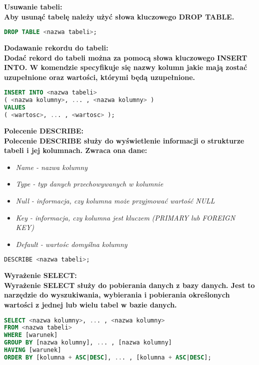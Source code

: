 \documentclass[a4paper,12pt]{article}
\newcommand{\h}[1]{\noindent \bf #1 \rm \\ \noindent}
\newcommand{\italic}[1]{\it #1 \rm}
\begin{document}
\h{Usuwanie tabeli:}
Aby usunąć tabelę należy użyć słowa kluczowego DROP TABLE.
\begin{lstlisting}[language=SQL]
DROP TABLE <nazwa tabeli>;
\end{lstlisting}
\vspace{5mm}

\h{Dodawanie rekordu do tabeli:}
Dodać rekord do tabeli można za pomocą słowa kluczowego INSERT INTO. W komendzie specyfikuje się nazwy kolumn jakie mają zostać uzupełnione oraz wartości, którymi będą uzupełnione.
\begin{lstlisting}[language=SQL]
INSERT INTO <nazwa tabeli> 
( <nazwa kolumny>, ... , <nazwa kolumny> )
VALUES 
( <wartosc>, ... , <wartosc> );
\end{lstlisting}
\vspace{5mm}

\h{Polecenie DESCRIBE:}
Polecenie DESCRIBE służy do wyświetlenie informacji o strukturze tabeli i jej kolumnach. Zwraca ona dane:
\begin{itemize}
	\item \italic{Name} - nazwa kolumny
	\item \italic{Type} - typ danych przechowywanych w kolumnie
	\item \italic{Null} - informacja, czy kolumna może przyjmować wartość NULL
	\item \italic{Key} - informacja, czy kolumna jest kluczem (PRIMARY lub FOREIGN KEY)
	\item \italic{Default} - wartośc domyślna kolumny
\end{itemize}
\vspace{5mm}

\begin{lstlisting}[language=SQL]
DESCRIBE <nazwa tabeli>;
\end{lstlisting}
\vspace{5mm}

\h{Wyrażenie SELECT:}
Wyrażenie SELECT służy do pobierania danych z bazy danych. Jest to narzędzie do wyszukiwania, wybierania i pobierania określonych wartości z jednej lub wielu tabel w bazie danych.
\begin{lstlisting}[language=SQL]
SELECT <nazwa kolumny>, ... , <nazwa kolumny>
FROM <nazwa tabeli>
WHERE [warunek]
GROUP BY [nazwa kolumny], ... , [nazwa kolumny]
HAVING [warunek]
ORDER BY [kolumna + ASC|DESC], ... , [kolumna + ASC|DESC];
\end{lstlisting}
\vspace{5mm}
\end{document}
